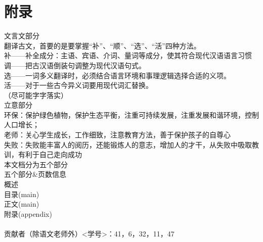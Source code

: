 \appendix
{}
\section{附录}
文言文部分\\
翻译古文，首要的是要掌握“补”、“顺”、“选”、“活”四种方法。\\
补——补全成分：主语、宾语、介词、量词等成分，使其符合现代汉语语言习惯\\
调——把古汉语倒装句调整为现代汉语句式。\\
选——一词多义翻译时，必须结合语言环境和事理逻辑选择合适的义项。\\
活——对于一些古今异义词要用现代词汇替换。\\
（尽可能字字落实）
\\
立意部分\\
环保：保护绿色植物，保护生态平衡，注重可持续发展，注重发展和谐环境，控制人口增长；\\
老师：关心学生成长，工作细致，注意教育方法，善于保护孩子的自尊心\\
失败：失败能丰富人的阅历，还能锻炼人的意志，增加人的才干，从失败中吸取教训，有利于自己走向成功\\
本文档分为五个部分\\
五个部分\&页数信息\\
概述\pageref{abstractformal}\\
目录(main)\pageref{contents}\\
正文(main)\pageref{main}\\
附录(appendix)\pageref{appendixformal}\\
\label{appendixformal} \\
贡献者（除语文老师外）<学号>：41，6，32，11，47